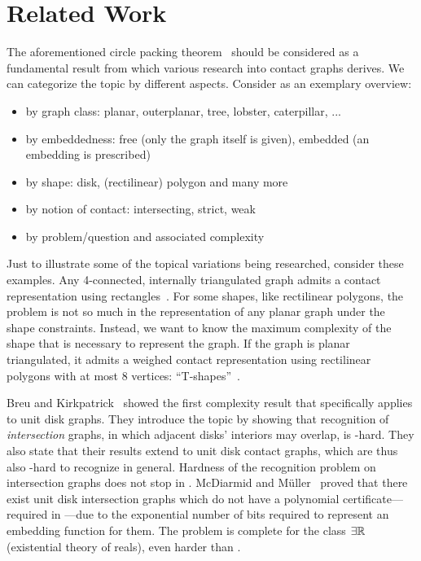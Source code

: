 
\chapter{Related Work}
\label{chp:related-work}

The aforementioned circle packing theorem~\cite{Koebe1936} should be considered as a fundamental result from which various research into contact graphs derives. We can categorize the topic by different aspects. Consider as an exemplary overview:

\begin{itemize}
    \item by graph class: planar, outerplanar, tree, lobster, caterpillar, ...
    \item by embeddedness: free (only the graph itself is given), embedded (an embedding is prescribed)
    \item by shape: disk, (rectilinear) polygon and many more
    \item by notion of contact: intersecting, strict, weak
    \item by problem/question and associated complexity
\end{itemize}


Just to illustrate some of the topical variations being researched, consider these examples. Any 4-connected, internally triangulated graph admits a contact representation using rectangles~\cite{kozminski_rectangular_1985}. For some shapes, like rectilinear polygons, the problem is not so much in the representation of any planar graph under the shape constraints. Instead, we want to know the maximum complexity of the shape that is necessary to represent the graph. If the graph is planar triangulated, it admits a weighed contact representation using rectilinear polygons with at most 8 vertices: ``T-shapes''~\cite{alam_computing_2013}.

Breu and Kirkpatrick~\cite{Breu1998} showed the first complexity result that specifically applies to unit disk graphs. They introduce the topic by showing that recognition of \emph{intersection} graphs, in which adjacent disks' interiors may overlap, is \NP-hard. They also state that their results extend to unit disk contact graphs, which are thus also \NP-hard to recognize in general. Hardness of the recognition problem on intersection graphs does not stop in \NP. McDiarmid and Müller~\cite{mcdiarmid_integer_2013} proved that there exist unit disk intersection graphs which do not have a polynomial certificate---required in \NP---due to the exponential number of bits required to represent an embedding function for them. The problem is complete for the class $\exists \mathbb R$ (existential theory of reals), even harder than \NP.


